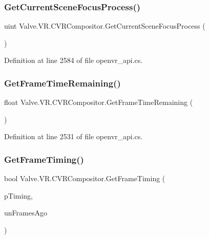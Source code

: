 \subsubsection{\texorpdfstring{GetCurrentSceneFocusProcess()}{GetCurrentSceneFocusProcess()}}
{\footnotesize\ttfamily uint Valve.\+V\+R.\+C\+V\+R\+Compositor.\+Get\+Current\+Scene\+Focus\+Process (\begin{DoxyParamCaption}{ }\end{DoxyParamCaption})}



Definition at line 2584 of file openvr\+\_\+api.\+cs.

\mbox{\label{class_valve_1_1_v_r_1_1_c_v_r_compositor_aee1331fd25c50a38f937bcac4480bcd5}} 
\subsubsection{\texorpdfstring{GetFrameTimeRemaining()}{GetFrameTimeRemaining()}}
{\footnotesize\ttfamily float Valve.\+V\+R.\+C\+V\+R\+Compositor.\+Get\+Frame\+Time\+Remaining (\begin{DoxyParamCaption}{ }\end{DoxyParamCaption})}



Definition at line 2531 of file openvr\+\_\+api.\+cs.

\mbox{\label{class_valve_1_1_v_r_1_1_c_v_r_compositor_a71bfd8b0a546740f5a6f5cc5bcb1e8a8}} 
\subsubsection{\texorpdfstring{GetFrameTiming()}{GetFrameTiming()}}
{\footnotesize\ttfamily bool Valve.\+V\+R.\+C\+V\+R\+Compositor.\+Get\+Frame\+Timing (\begin{DoxyParamCaption}\item[{ref \mbox{\hyperlink{struct_valve_1_1_v_r_1_1_compositor___frame_timing}{Compositor\+\_\+\+Frame\+Timing}}}]{p\+Timing,  }\item[{uint}]{un\+Frames\+Ago }\end{DoxyParamCaption})}



